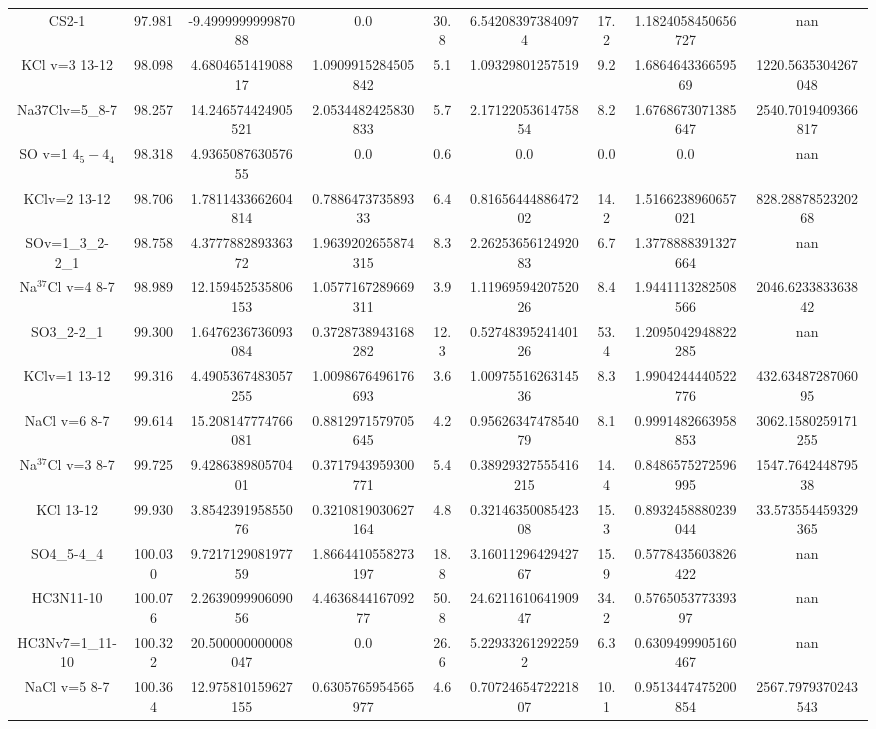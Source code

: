 \begin{table*}[htp]
\begin{tabular}{ccccccccc}
CS2-1 & 97.981 & -9.499999999987088 & 0.0 & 30.8 & 6.542083973840974 & 17.2 & 1.1824058450656727 & nan \\
KCl v=3 13-12 & 98.098 & 4.680465141908817 & 1.0909915284505842 & 5.1 & 1.09329801257519 & 9.2 & 1.686464336659569 & 1220.5635304267048 \\
Na37Clv=5_8-7 & 98.257 & 14.246574424905521 & 2.0534482425830833 & 5.7 & 2.1712205361475854 & 8.2 & 1.6768673071385647 & 2540.7019409366817 \\
SO v=1 $4_5-4_4$ & 98.318 & 4.936508763057655 & 0.0 & 0.6 & 0.0 & 0.0 & 0.0 & nan \\
KClv=2 13-12 & 98.706 & 1.7811433662604814 & 0.788647373589333 & 6.4 & 0.8165644488647202 & 14.2 & 1.5166238960657021 & 828.2887852320268 \\
SOv=1_3_2-2_1 & 98.758 & 4.377788289336372 & 1.9639202655874315 & 8.3 & 2.2625365612492083 & 6.7 & 1.3778888391327664 & nan \\
Na$^{37}$Cl v=4 8-7 & 98.989 & 12.159452535806153 & 1.0577167289669311 & 3.9 & 1.1196959420752026 & 8.4 & 1.9441113282508566 & 2046.623383363842 \\
SO3_2-2_1 & 99.300 & 1.6476236736093084 & 0.3728738943168282 & 12.3 & 0.5274839524140126 & 53.4 & 1.2095042948822285 & nan \\
KClv=1 13-12 & 99.316 & 4.4905367483057255 & 1.0098676496176693 & 3.6 & 1.0097551626314536 & 8.3 & 1.9904244440522776 & 432.6348728706095 \\
NaCl v=6 8-7 & 99.614 & 15.208147774766081 & 0.8812971579705645 & 4.2 & 0.9562634747854079 & 8.1 & 0.9991482663958853 & 3062.1580259171255 \\
Na$^{37}$Cl v=3 8-7 & 99.725 & 9.428638980570401 & 0.3717943959300771 & 5.4 & 0.38929327555416215 & 14.4 & 0.8486575272596995 & 1547.764244879538 \\
KCl 13-12 & 99.930 & 3.854239195855076 & 0.3210819030627164 & 4.8 & 0.3214635008542308 & 15.3 & 0.8932458880239044 & 33.573554459329365 \\
SO4_5-4_4 & 100.030 & 9.721712908197759 & 1.8664410558273197 & 18.8 & 3.1601129642942767 & 15.9 & 0.5778435603826422 & nan \\
HC3N11-10 & 100.076 & 2.263909990609056 & 4.463684416709277 & 50.8 & 24.621161064190947 & 34.2 & 0.576505377339397 & nan \\
HC3Nv7=1_11-10 & 100.322 & 20.500000000008047 & 0.0 & 26.6 & 5.229332612922592 & 6.3 & 0.6309499905160467 & nan \\
NaCl v=5 8-7 & 100.364 & 12.975810159627155 & 0.6305765954565977 & 4.6 & 0.7072465472221807 & 10.1 & 0.9513447475200854 & 2567.7979370243543 \\

\end{tabular}
\end{table*}
